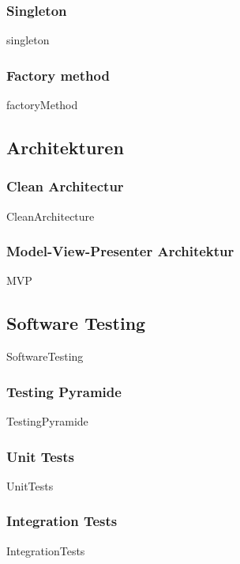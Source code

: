 \documentclass{article}
\begin{document}
        \subsubsection{Singleton}
        \label{kap:gof:singleton}
            {singleton}
        \subsubsection{Factory method}
        \label{kap:gof:factory}
            {factoryMethod}
            

    \subsection{Architekturen}
        \subsubsection{Clean Architectur}
            {CleanArchitecture}
        \newpage
        \subsubsection{Model-View-Presenter Architektur}
        \label{kap:MVC}
            {MVP}



    \subsection{Software Testing}
        {SoftwareTesting}

        \subsubsection{Testing Pyramide}
            {TestingPyramide}
        
        \subsubsection{Unit Tests}
            {UnitTests}
        
        \subsubsection{Integration Tests}
            {IntegrationTests}
\end{document}
